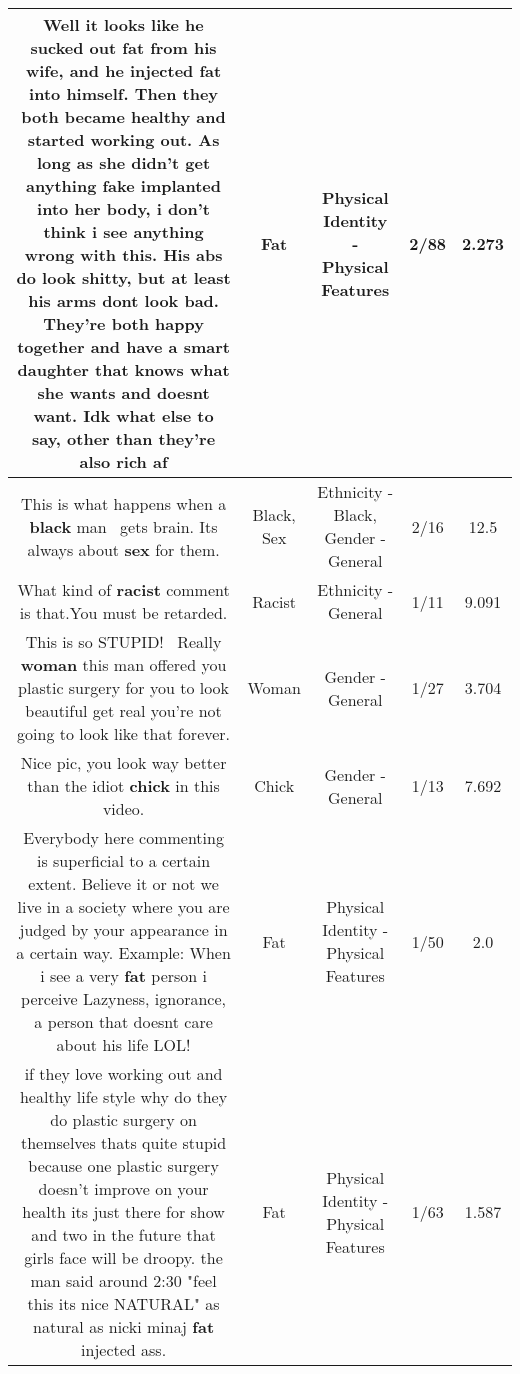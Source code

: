 \documentclass[11pt]{article}
\newlength\mylength
\begin{document}
\begin{center}
\begin{longtable}{|C{.65\mylength}|C{.30\mylength}|C{.12\mylength}|C{.12\mylength}|C{.12\mylength}|}
  \small Well it looks like he sucked out \textbf{fat} from his wife, and he injected \textbf{fat} into himself. Then they both became healthy and started working out. As long as she didn't get anything fake implanted into her body, i don't think i see anything wrong with this. His abs do look shitty, but at least his arms dont look bad. They're both happy together and have a smart daughter that knows what she wants and doesnt want. Idk what else to say, other than they're also rich af\normalsize   & Fat & Physical Identity - Physical Features & 2/88 & 2.273 \\  \hline
  \small This is what happens when a \textbf{black} man  gets brain. Its always about \textbf{sex} for them.\normalsize   & Black, Sex & Ethnicity - Black, Gender - General & 2/16 & 12.5 \\  \hline
  \small What kind of \textbf{racist} comment is that.You must be retarded.\normalsize   & Racist & Ethnicity - General & 1/11 & 9.091 \\  \hline
  \small This is so STUPID!  Really \textbf{woman} this man offered you plastic surgery for you to look beautiful get real you're not going to look like that forever.\normalsize   & Woman & Gender - General & 1/27 & 3.704 \\  \hline
  \small Nice pic, you look way better than the idiot \textbf{chick} in this video.\normalsize   & Chick & Gender - General & 1/13 & 7.692 \\  \hline
  \small Everybody here commenting is superficial to a certain extent. Believe it or not we live in a society where you are judged by your appearance in a certain way. Example: When i see a very \textbf{fat} person i perceive Lazyness, ignorance, a person that doesnt care about his life LOL!\normalsize   & Fat & Physical Identity - Physical Features & 1/50 & 2.0 \\  \hline
  \small if they love working out and healthy life style why do they do plastic surgery on themselves thats quite stupid because one plastic surgery doesn't improve on your health its just there for show and two in the future that girls face will be droopy. the man said around 2:30 "feel this its nice NATURAL" as natural as nicki minaj \textbf{fat} injected ass.\normalsize   & Fat & Physical Identity - Physical Features & 1/63 & 1.587 \\  \hline

\end{longtable}
\end{center}
\end{document}
